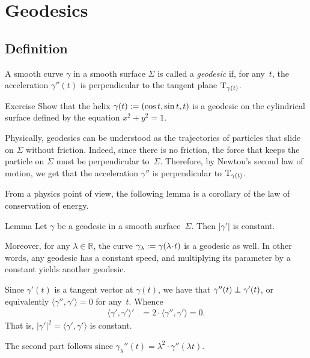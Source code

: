 \chapter{Geodesics}
\label{chap:geodesics}


\section{Definition}

A smooth curve $\gamma$ in a smooth surface $\Sigma$ is called a \emph{geodesic} if, for any~$t$, the acceleration $\gamma''(t)$ is perpendicular to the tangent plane $\mathrm{T}_{\gamma(t)}$.

\begin{thm}{Exercise}\label{ex:helix-geodesic}
Show that the helix $\gamma(t)\z\df(\cos t,\sin t, t)$ is a geodesic on the cylindrical surface defined by the equation $x^2+y^2=1$.
\end{thm}


Physically, geodesics can be understood as the trajectories of particles that slide on $\Sigma$ without friction.
Indeed, since there is no friction, the force that keeps the particle on $\Sigma$ must be perpendicular to~$\Sigma$.
Therefore, by Newton's second law of motion,
we get that the acceleration $\gamma''$ is perpendicular to $\mathrm{T}_{\gamma(t)}$.

From a physics point of view, the following lemma is a corollary of the law of conservation of energy.


\begin{thm}{Lemma}\label{lem:constant-speed}
Let $\gamma$ be a geodesic in a smooth surface~$\Sigma$. 
Then $|\gamma'|$ is constant.

Moreover, for any $\lambda\in\mathbb{R}$, the curve 
$\gamma_{\lambda}\df \gamma (\lambda\cdot t)$ is a geodesic as well. 
In other words, any geodesic has a constant speed, and multiplying its parameter by a constant yields another geodesic.
\end{thm}


Since $\gamma'(t)$ is a tangent vector at $\gamma(t)$,
we have that $\gamma''(t)\z\perp\gamma'(t)$, or equivalently $\langle\gamma'',\gamma'\rangle=0$ for any~$t$.
Whence 
\begin{align*}
\langle\gamma',\gamma'\rangle'&=2\cdot \langle\gamma'',\gamma'\rangle=0.
\end{align*}
That is, $|\gamma'|^2=\langle\gamma',\gamma'\rangle$ is constant.

The second part follows since 
$\gamma_{\lambda}''(t) =\lambda^2\cdot \gamma''(\lambda t)$.
\qeds


